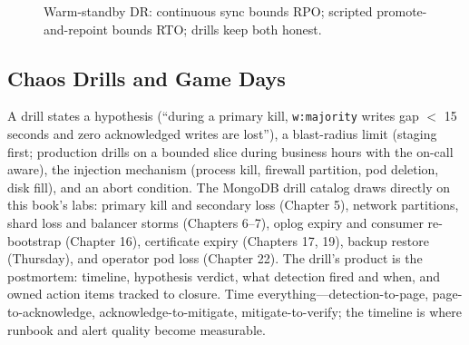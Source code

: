 \begin{figure}[H]
    \centering
    \caption{Warm-standby DR: continuous sync bounds RPO; scripted promote-and-repoint bounds RTO; drills keep both honest.}
    \label{fig:ch23-dr}
\end{figure}

\subsection{Chaos Drills and Game Days}
A drill states a hypothesis (``during a primary kill, \texttt{w:majority} writes gap $<$ 15 seconds and zero acknowledged writes are lost''), a blast-radius limit (staging first; production drills on a bounded slice during business hours with the on-call aware), the injection mechanism (process kill, firewall partition, pod deletion, disk fill), and an abort condition. The MongoDB drill catalog draws directly on this book's labs: primary kill and secondary loss (Chapter 5), network partitions, shard loss and balancer storms (Chapters 6--7), oplog expiry and consumer re-bootstrap (Chapter 16), certificate expiry (Chapters 17, 19), backup restore (Thursday), and operator pod loss (Chapter 22). The drill's product is the postmortem: timeline, hypothesis verdict, what detection fired and when, and owned action items tracked to closure. Time everything---detection-to-page, page-to-acknowledge, acknowledge-to-mitigate, mitigate-to-verify; the timeline is where runbook and alert quality become measurable.

